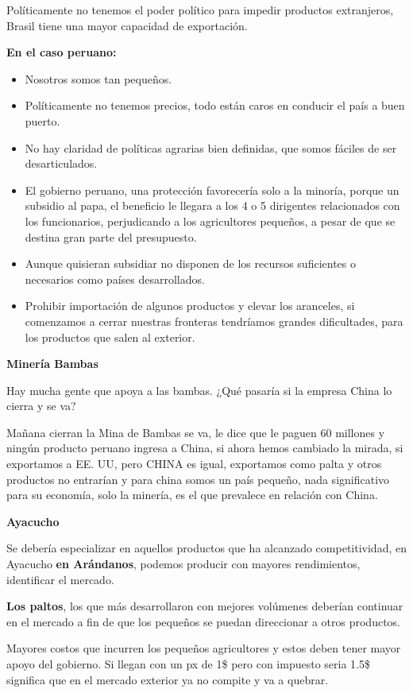\documentclass[
  letterpaper,
  DIV=11,
  numbers=noendperiod]{scrartcl}
\begin{document}
Políticamente no tenemos el poder político para impedir productos
extranjeros, Brasil tiene una mayor capacidad de exportación.

\textbf{En el caso peruano:}

\begin{itemize}
\item
  Nosotros somos tan pequeños.
\item
  Políticamente no tenemos precios, todo están caros en conducir el país
  a buen puerto.
\item
  No hay claridad de políticas agrarias bien definidas, que somos
  fáciles de ser desarticulados.
\item
  El gobierno peruano, una protección favorecería solo a la minoría,
  porque un subsidio al papa, el beneficio le llegara a los 4 o 5
  dirigentes relacionados con los funcionarios, perjudicando a los
  agricultores pequeños, a pesar de que se destina gran parte del
  presupuesto.
\item
  Aunque quisieran subsidiar no disponen de los recursos suficientes o
  necesarios como países desarrollados.
\item
  Prohibir importación de algunos productos y elevar los aranceles, si
  comenzamos a cerrar nuestras fronteras tendríamos grandes
  dificultades, para los productos que salen al exterior.
\end{itemize}

\textbf{Minería Bambas}

Hay mucha gente que apoya a las bambas. ¿Qué pasaría si la empresa China
lo cierra y se va?

Mañana cierran la Mina de Bambas se va, le dice que le paguen 60
millones y ningún producto peruano ingresa a China, si ahora hemos
cambiado la mirada, si exportamos a EE. UU, pero CHINA es igual,
exportamos como palta y otros productos no entrarían y para china somos
un país pequeño, nada significativo para su economía, solo la minería,
es el que prevalece en relación con China.

\textbf{Ayacucho}

Se debería especializar en aquellos productos que ha alcanzado
competitividad, en Ayacucho \textbf{en Arándanos}, podemos producir con
mayores rendimientos, identificar el mercado.

\textbf{Los paltos}, los que más desarrollaron con mejores volúmenes
deberían continuar en el mercado a fin de que los pequeños se puedan
direccionar a otros productos.

Mayores costos que incurren los pequeños agricultores y estos deben
tener mayor apoyo del gobierno. Si llegan con un px de 1\$ pero con
impuesto seria 1.5\$ significa que en el mercado exterior ya no compite
y va a quebrar.
\end{document}

